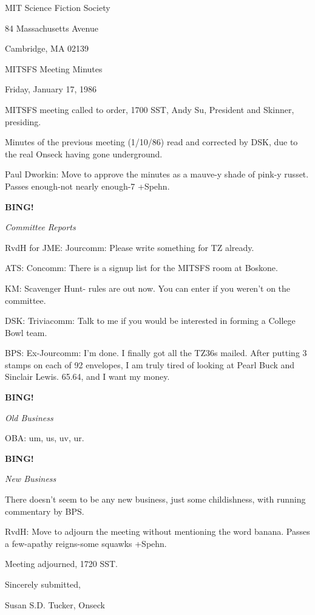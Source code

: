 \documentclass[12pt]{article}
\newcommand{\bing}{{\bf BING!} }
\newcommand{\goto}[1]{\bing \vskip 12pt \centerline{{\em{#1}}}}
\begin{document}
\begin{center}

MIT Science Fiction Society 

84 Massachusetts Avenue

Cambridge, MA 02139

\vspace{12pt}

MITSFS Meeting Minutes 

Friday, January 17, 1986

\end{center}
 
\vspace{18pt}

\setlength{\parskip}{6pt}

\noindent
MITSFS meeting called to order, 1700 SST,
Andy Su, President and Skinner, presiding.

Minutes of the previous meeting (1/10/86) read and corrected by DSK, due to the real Onseck having gone underground.

Paul Dworkin: Move to approve the minutes as a mauve-y shade of pink-y russet. Passes enough-not nearly enough-7 +Spehn.

\goto{Committee Reports}

RvdH for JME: Jourcomm: Please write something for TZ already.

ATS: Concomm: There is a signup list for the MITSFS room at Boskone.

KM: Scavenger Hunt- rules are out now. You can enter if you weren't on the committee.

DSK: Triviacomm: Talk to me if you would be interested in forming a College Bowl team.

BPS: Ex-Jourcomm: I'm done. I finally got all the TZ36s mailed. After putting 3 stamps on each of 92 envelopes, I am truly tired of looking at Pearl Buck and Sinclair Lewis. 65.64, and I want my money.

\goto{Old Business}

OBA: um, us, uv, ur.

\goto{New Business}

There doesn't seem to be any new business, just some childishness, with running commentary by BPS.

RvdH: Move to adjourn the meeting without mentioning the word banana. Passes a few-apathy reigns-some squawks +Spehn.

\vspace{12pt}

\noindent
Meeting adjourned, 1720 SST.

\vspace{18pt}

\centerline{Sincerely submitted,}
\centerline{Susan S.D. Tucker, Onseck}
\end{document}
